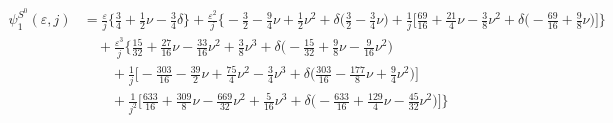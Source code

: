 \documentclass[prd,superscriptaddress,preprintnumbers,tightenlines,nofootinbib, eqsecnum]{revtex4-2}
\newcommand{\nn}{\nonumber}
\begin{document}
\begin{align}
\psi_1^{S^0}(\varepsilon,j) &= \frac{\varepsilon}{j}\Bigg\{
\frac{3}{4} + \frac{1}{2}\nu - \frac{3}{4}\delta\Bigg\} + \frac{\varepsilon^{2}}{j}\Bigg\{
-\frac{3}{2} - \frac{9}{4}\nu + \frac{1}{2}\nu^{2} + \delta\bigg(\frac{3}{2} - \frac{3}{4}\nu\bigg) + \frac{1}{j}\Bigg[\frac{69}{16} + \frac{21}{4}\nu - \frac{3}{8}\nu^{2} + \delta\bigg(-\frac{69}{16} + \frac{9}{8}\nu\bigg)\Bigg]\Bigg\} \nn \\
&\quad + \frac{\varepsilon^{3}}{j}\Bigg\{
\frac{15}{32} + \frac{27}{16}\nu - \frac{33}{16}\nu^{2} + \frac{3}{8}\nu^{3} + \delta\bigg(-\frac{15}{32} + \frac{9}{8}\nu - \frac{9}{16}\nu^{2}\bigg) \nn \\
&\qquad + \frac{1}{j}\Bigg[-\frac{303}{16} - \frac{39}{2}\nu + \frac{75}{4}\nu^{2} - \frac{3}{4}\nu^{3} + \delta\bigg(\frac{303}{16} - \frac{177}{8}\nu + \frac{9}{4}\nu^{2}\bigg)\Bigg] \nn \\
&\qquad + \frac{1}{j^{2}}\Bigg[\frac{633}{16} + \frac{309}{8}\nu - \frac{669}{32}\nu^{2} + \frac{5}{16}\nu^{3} + \delta\bigg(-\frac{633}{16} + \frac{129}{4}\nu - \frac{45}{32}\nu^{2}\bigg)\Bigg]\Bigg\} 
\end{align}
\end{document}
